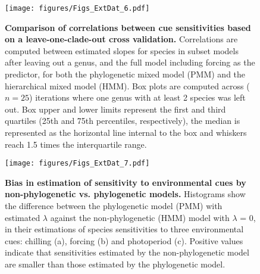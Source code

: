 \documentclass{article}
\begin{document}
\begin{figure}
  \centering
\noindent \texttt{[image: figures/Figs\_ExtDat\_6.pdf]}
  \caption{\textbf{Comparison of correlations between cue sensitivities based on a leave-one-clade-out cross validation.} Correlations are computed between estimated slopes for species in subset models after leaving out a genus, and the full model including forcing as the predictor, for both the phylogenetic mixed model (PMM) and the hierarchical mixed model (HMM). Box plots are computed across ($n = 25$) iterations where one genus with at least 2 species was left out. Box upper and lower limits represent the first and third quartiles (25th and 75th percentiles, respectively), the median is represented as the horizontal line internal to the box and whiskers reach 1.5 times the interquartile range.}
  \label{fig:LOCO_obsvspred} 
\end{figure}
\clearpage

\begin{figure}
  \centering
\noindent \texttt{[image: figures/Figs\_ExtDat\_7.pdf]}
  \caption{\textbf{Bias in estimation of sensitivity to environmental cues by non-phylogenetic vs. phylogenetic models.} Histograms show the difference between the phylogenetic model (PMM) with estimated $\lambda$ against the non-phylogenetic (HMM) model with $\lambda$ = 0, in their estimations of species sensitivities to three environmental cues: chilling (a), forcing (b) and photoperiod (c). Positive values indicate that sensitivities estimated by the non-phylogenetic model are smaller than those estimated by the phylogenetic model.}
  \label{fig:LOCO_slopescors}
\end{figure}
\end{document}
